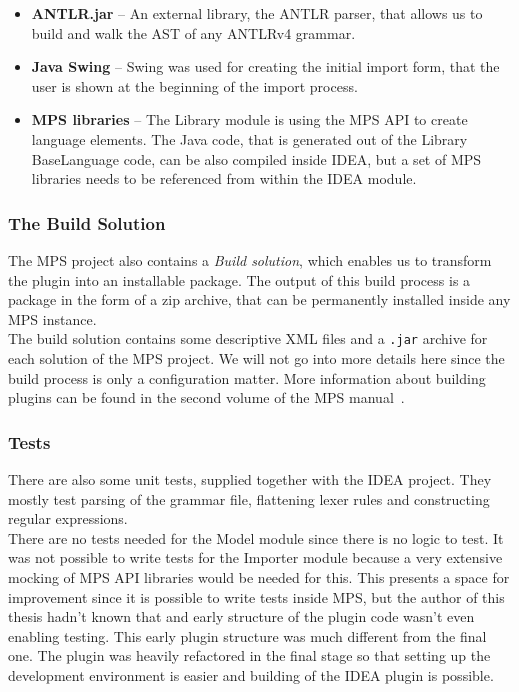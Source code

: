 \begin{itemize}
	\item \textbf{ANTLR.jar} -- An external library, the ANTLR parser, that allows us to build and walk the AST of any ANTLRv4 grammar.

	\item \textbf{Java Swing} -- Swing was used for creating the initial import form, that the user is shown at the beginning of the import process.

	\item \textbf{MPS libraries} -- The Library module is using the MPS API to create language elements. The Java code, that is generated out of the Library BaseLanguage code, can be also compiled inside IDEA, but a set of MPS libraries needs to be referenced from within the IDEA module.
\end{itemize}

\subsubsection{The Build Solution}
\label{chap:the_build_solution}

The MPS project also contains a \textit{Build solution}, which enables us to transform the plugin into an installable package.
The output of this build process is a package in the form of a zip archive, that can be permanently installed inside any MPS instance.
\\

The build solution contains some descriptive XML files and a \texttt{.jar} archive for each solution of the MPS project.
We will not go into more details here since the build process is only a configuration matter.
More information about building plugins can be found in the second volume of the MPS manual~\cite{MPS2}.

\subsubsection{Tests}

There are also some unit tests, supplied together with the IDEA project.
They mostly test parsing of the grammar file, flattening lexer rules and constructing regular expressions.
\\

There are no tests needed for the Model module since there is no logic to test.
It was not possible to write tests for the Importer module because a very extensive mocking of MPS API libraries would be needed for this.
This presents a space for improvement since it is possible to write tests inside MPS, but the author of this thesis hadn't known that and early structure of the plugin code wasn't even enabling testing.
This early plugin structure was much different from the final one.
The plugin was heavily refactored in the final stage so that setting up the development environment is easier and building of the IDEA plugin is possible.

